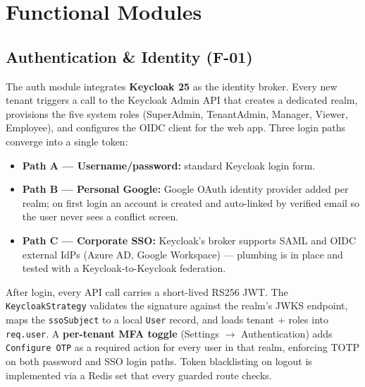 \documentclass[11pt,a4paper]{article}
\newcommand{\code}[1]{\texttt{\small #1}}
\begin{document}
\section{Functional Modules}\label{sec:modules}

\subsection{Authentication \& Identity (F-01)}

The auth module integrates \textbf{Keycloak 25} as the identity broker. Every new
tenant triggers a call to the Keycloak Admin API that creates a dedicated realm,
provisions the five system roles (SuperAdmin, TenantAdmin, Manager, Viewer, Employee),
and configures the OIDC client for the web app. Three login paths converge into a
single token:

\begin{itemize}
  \item \textbf{Path A --- Username/password:} standard Keycloak login form.
  \item \textbf{Path B --- Personal Google:} Google OAuth identity provider added per
  realm; on first login an account is created and auto-linked by verified email so the
  user never sees a conflict screen.
  \item \textbf{Path C --- Corporate SSO:} Keycloak's broker supports SAML and OIDC
  external IdPs (Azure AD, Google Workspace) --- plumbing is in place and tested with a
  Keycloak-to-Keycloak federation.
\end{itemize}

After login, every API call carries a short-lived RS256 JWT. The \code{KeycloakStrategy}
validates the signature against the realm's JWKS endpoint, maps the \code{ssoSubject} to
a local \code{User} record, and loads tenant + roles into \code{req.user}. A
\textbf{per-tenant MFA toggle} (Settings $\rightarrow$ Authentication) adds
\code{Configure~OTP} as a required action for every user in that realm, enforcing
TOTP on both password and SSO login paths. Token blacklisting on logout is implemented
via a Redis set that every guarded route checks.
\end{document}
